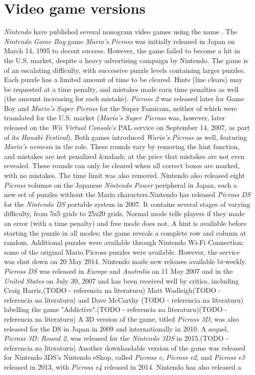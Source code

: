 {{\chapter{Video game versions}
\textit{Nintendo} have published several nonogram video games using the name . The \textit{Nintendo Game Boy} game \textit{\textit{Mario's Picross}} was initially released in Japan on March 14, 1995 to decent success. However, the game failed to become a hit in the U.S. market, despite a heavy advertising campaign by Nintendo. The game is of an escalating difficulty, with successive puzzle levels containing larger puzzles. Each puzzle has a limited amount of time to be cleared. Hints (line clears) may be requested at a time penalty, and mistakes made earn time penalties as well (the amount increasing for each mistake). \textit{Picross 2} was released later for Game Boy and \textit{\textit{Mario's Super Picross}} for the Super Famicom, neither of which were translated for the U.S. market (\textit{Mario's Super Picross} was, however, later released on the \textit{Wii} \textit{Virtual Console}'s PAL service on September 14, 2007, as part of its \textit{Hanabi Festival}). Both games introduced \textit{Wario's Picross} as well, featuring \textit{Mario's nemesis} in the role. These rounds vary by removing the hint function, and mistakes are not penalized &mdash; at the price that mistakes are not even revealed. These rounds can only be cleared when all correct boxes are marked, with no mistakes. The time limit was also removed. Nintendo also released eight \textit{Picross} volumes on the Japanese \textit{Nintendo Power} peripheral in Japan, each a new set of puzzles without the Mario characters.Nintendo has released \textit{\textit{Picross DS}} for the \textit{Nintendo DS} portable system in 2007. It contains several stages of varying difficulty, from 5x5 grids to 25x20 grids. Normal mode tells players if they made an error (with a time penalty) and free mode does not. A hint is available before starting the puzzle in all modes; the game reveals a complete row and column at random. Additional puzzles were available through Nintendo Wi-Fi Connection; some of the original Mario Picross puzzles were available. However, the service was shut down on 20 May 2014. Nintendo made new releases available bi-weekly. \textit{Picross DS} was released in \textit{Europe} and \textit{Australia} on 11 May 2007 and in the \textit{United States} on July 30, 2007 and has been received well by critics, including Craig Harris,(TODO - referencia na literaturu) Matt Wadleigh(TODO - referencia na literaturu) and Dave McCarthy (TODO - referencia na literaturu) labelling the game "Addictive".(TODO - referencia na literaturu)(TODO - referencia na literaturu) A 3D version of the game, titled \textit{\textit{Picross 3D}}, was also released for the DS in Japan in 2009 and internationally in 2010. A sequel, \textit{\textit{Picross 3D: Round 2}}, was released for the \textit{Nintendo 3DS} in 2015.(TODO - referencia na literaturu) Another downloadable version of the game was released for Nintendo 3DS's Nintendo eShop, called \textit{Picross e}, \textit{Picross e2}, and \textit{Picross e3} released in 2013, with \textit{Picross e4} released in 2014. Nintendo has also released a }}
